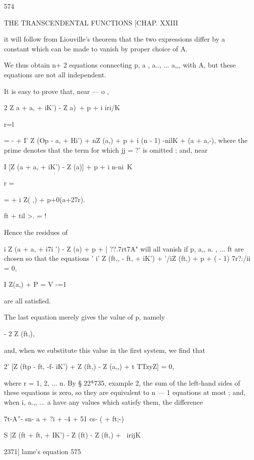 {{{{{{{{574



THE TRANSCENDENTAL FUNCTIONS [CHAP. XXIII



it will follow from Liouville's theorem that the two expressions
differ by a constant which can be made to vanish by proper choice of
A.

We thus obtain n+ 2 equations connecting p, a , a.., ... a,,, with A,
but these equations are not all independent.

It is easy to prove that, near — o ,

2 Z a + a, + iK') - Z a)\ + p + i iri/K

r=l

= - + I' Z (Op - a, + Hi') + nZ (a,) + p + i (n - 1) -nilK + (a +
a,-), where the prime denotes that the term for which jj = ?' is
omitted ; and, near

I [Z (a + a, + iK') - Z (a)] + p + i n-ni\ K

r = \

= + i Z( ,) + p+0(a+27r).

ft + til >. = !

Hence the residues of

i Z (a + a, + i7i ') - Z (a) + p + | ??.7rt7A" will all vanish if p,
a,, a. , ... ft are chosen so that the equations ' i' Z (ft,, - ft, +
iK') + '/iZ (ft,) + p + ( - 1) 7r?:/ii = 0,

I Z(a,) + P = V -=1

are all satisfied.

The last equation merely gives the value of p, namely

- 2 Z (ft,),

and, when we substitute this value in the first system, we find that

2' [Z (ftp - ft, -f- iK') + Z (ft,) - Z (a,,) + t TTzyZ] = 0,

where r = 1, 2, ... n. By § 22*735, example 2, the sum of the
left-hand sides of these equations is zero, so they are equivalent to
n — 1 equations at most ; and, when i, a.,, ... a have any values
which satisfy them, the difference



7t-A''- sn- a + ?i + -4 + 51 cs- ( + ft;-)



S |Z (ft + ft, + IK') - Z (ft) - Z (ft,) + \ irijK\



2371] lame's equation 575

}}}}}}}}
